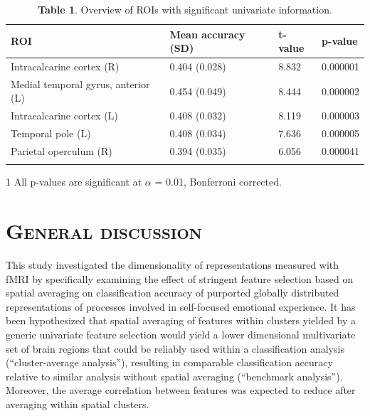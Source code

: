 \documentclass[jou,12pt,a4paper]{apa6}
\begin{document}
\begin{table}[ht]
\caption*{\textbf{Table 1}. Overview of ROIs with significant univariate information.}

\begin{threeparttable}
\begin{tabular*}{\textwidth}{l @{\extracolsep{\fill}} lll}
\hline\hline
\textbf{ROI} & \textbf{Mean accuracy (SD)} & \textbf{t-value} & \textbf{p-value}\tnote{1} \\ \hline

Intracalcarine cortex (R)           & 0.404 (0.028)           & 8.832            & 0.000001         \\
Medial temporal gyrus, anterior (L) & 0.454 (0.049)           & 8.444            & 0.000002         \\
Intracalcarine cortex (L)           & 0.408 (0.032)           & 8.119            & 0.000003         \\
Temporal pole (L)                   & 0.408 (0.034)           & 7.636            & 0.000005         \\
Parietal operculum (R)              & 0.394 (0.035)           & 6.056            & 0.000041         \\ \hline
\\
\end{tabular*}
\begin{tablenotes} 
		\item [1] \small{All p-values are significant at $\alpha$ = 0.01, Bonferroni corrected.}
		\end{tablenotes}
\end{threeparttable}
\end{table}

\section{\Large \textsc{General discussion}}
This study investigated the dimensionality of representations measured with fMRI by specifically examining the effect of stringent feature selection based on spatial averaging on classification accuracy of purported globally distributed representations of processes involved in self-focused emotional experience. It has been hypothesized that spatial averaging of features within clusters yielded by a generic univariate feature selection would yield a lower dimensional multivariate set of brain regions that could be reliably used within a classification analysis (``cluster-average analysis''), resulting in comparable classification accuracy relative to similar analysis without spatial averaging (``benchmark analysis''). Moreover, the average correlation between features was expected to reduce after averaging within spatial clusters.
\end{document}

